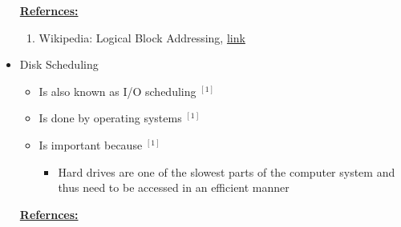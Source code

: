 \documentclass[12pt]{article}
\begin{document}
\begin{itemize}
    \bigskip

    \underline{\textbf{Refernces:}}

    \bigskip

    \begin{enumerate}[1)]
        \item Wikipedia: Logical Block Addressing, \href{https://en.wikipedia.org/wiki/Logical_block_addressing}{link}
    \end{enumerate}

    \item Disk Scheduling
    \begin{itemize}
        \item Is also known as I/O scheduling $^{[1]}$
        \item Is done by operating systems $^{[1]}$
        \item Is important because $^{[1]}$
        \begin{itemize}
            \item Hard drives are one of the slowest parts of the computer system
            and thus need to be accessed in an efficient manner
        \end{itemize}
    \end{itemize}

    \bigskip

    \underline{\textbf{Refernces:}}

    \bigskip


\end{itemize}
\end{document}
